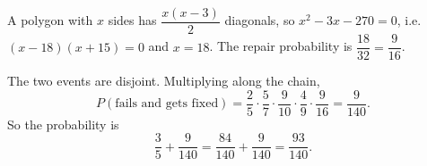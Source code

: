 A polygon with $x$ sides has $\dfrac{x(x-3)}{2}$ diagonals, so $x^2-3x-270=0$, i.e. $(x-18)(x+15)=0$ and $x=18$. The repair probability is $\dfrac{18}{32}=\dfrac{9}{16}$.

The two events are disjoint. Multiplying along the chain,
\[P(\text{fails and gets fixed})=\dfrac25\cdot\dfrac57\cdot\dfrac{9}{10}\cdot\dfrac49\cdot\dfrac{9}{16}=\dfrac{9}{140}.\]
So the probability is
\[\dfrac35+\dfrac{9}{140}=\dfrac{84}{140}+\dfrac{9}{140}=\boxed{\dfrac{93}{140}}.\]
